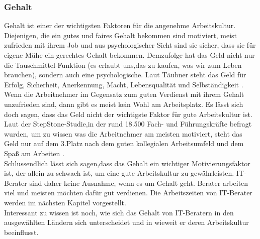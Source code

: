 \subsubsection{Gehalt}
Gehalt ist einer der wichtigsten Faktoren für die angenehme Arbeitskultur. Diejenigen, die ein gutes und faires Gehalt bekommen sind motiviert, meist zufrieden mit ihrem Job und aus psychologischer Sicht sind sie sicher, dass sie für eigene Mühe ein gerechtes Gehalt bekommen. Demzufolge hat das Geld nicht nur die Tauschmittel-Funktion (es erlaubt uns,das zu kaufen, was wir zum Leben brauchen), sondern auch eine psychologische. Laut Täubner steht das Geld für Erfolg, Sicherheit, Anerkennung, Macht, Lebensqualität und Selbständigkeit \cite{GehaltBedeutungDE}.\\
Wenn die Arbeitnehmer im Gegensatz zum guten Verdienst mit ihrem Gehalt unzufrieden sind, dann gibt es meist kein Wohl am Arbeitsplatz. Es lässt sich doch sagen, dass das Geld nicht der wichtigste Faktor für gute Arbeitskultur ist. Laut der StepStone-Studie,in der rund 18.500 Fach- und Führungskräfte befragt wurden, um zu wissen was die Arbeitnehmer am meisten motiviert, steht das Geld nur auf dem 3.Platz nach dem guten kollegialen Arbeitsumfeld und dem Spaß am Arbeiten \cite{GehaltNR.3DE}.\\
 Schlussendlich lässt sich sagen,dass das Gehalt ein wichtiger Motivierungsfaktor ist, der allein zu schwach ist, um eine gute Arbeitskultur zu gewährleisten.
IT-Berater sind daher keine Ausnahme, wenn es um Gehalt geht. Berater arbeiten viel und meisten möchten dafür gut verdienen. Die Arbeitszeiten von IT-Berater werden im nächsten Kapitel vorgestellt.\\
Interessant zu wissen ist noch, wie sich das Gehalt von IT-Beratern in den ausgewählten Ländern sich unterscheidet und in wieweit er deren Arbeitskultur beeinflusst.
